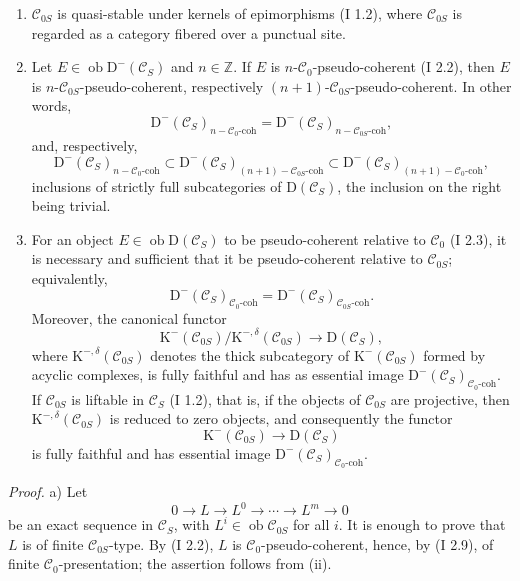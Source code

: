 \documentclass[11pt]{article}
\providecommand{\Ob}{\operatorname{ob}}
\begin{document}
\begin{enumerate}[label=\alph*)]
\item $\mathcal C_{0S}$ is quasi-stable under kernels of epimorphisms (I 1.2), where $\mathcal C_{0S}$ is regarded as a category fibered over a punctual site.
\item Let $E\in\Ob \mathrm D^{-}(\mathcal C_S)$ and $n\in\mathbb Z$. If $E$ is $n$-$\mathcal C_0$-pseudo-coherent (I 2.2), then $E$ is $n$-$\mathcal C_{0S}$-pseudo-coherent, respectively $(n+1)$-$\mathcal C_{0S}$-pseudo-coherent. In other words,
\[
\mathrm D^{-}(\mathcal C_S)_{n-\mathcal C_0\text{-coh}}
=
\mathrm D^{-}(\mathcal C_S)_{n-\mathcal C_{0S}\text{-coh}},
\]
and, respectively,
\[
\mathrm D^{-}(\mathcal C_S)_{n-\mathcal C_0\text{-coh}}
\subset
\mathrm D^{-}(\mathcal C_S)_{(n+1)-\mathcal C_{0S}\text{-coh}}
\subset
\mathrm D^{-}(\mathcal C_S)_{(n+1)-\mathcal C_0\text{-coh}},
\]
inclusions of strictly full subcategories of $\mathrm D(\mathcal C_S)$, the inclusion on the right being trivial.
\item For an object $E\in\Ob\mathrm D(\mathcal C_S)$ to be pseudo-coherent relative to $\mathcal C_0$ (I 2.3), it is necessary and sufficient that it be pseudo-coherent relative to $\mathcal C_{0S}$; equivalently,
\[
\mathrm D^{-}(\mathcal C_S)_{\mathcal C_0\text{-coh}}
=
\mathrm D^{-}(\mathcal C_S)_{\mathcal C_{0S}\text{-coh}}.
\]
Moreover, the canonical functor
\[
\mathrm K^{-}(\mathcal C_{0S})/\mathrm K^{-,\delta}(\mathcal C_{0S})
\longrightarrow \mathrm D(\mathcal C_S),
\]
where $\mathrm K^{-,\delta}(\mathcal C_{0S})$ denotes the thick subcategory of $\mathrm K^{-}(\mathcal C_{0S})$ formed by acyclic complexes, is fully faithful and has as essential image $\mathrm D^{-}(\mathcal C_S)_{\mathcal C_0\text{-coh}}$. If $\mathcal C_{0S}$ is liftable in $\mathcal C_S$ (I 1.2), that is, if the objects of $\mathcal C_{0S}$ are projective, then $\mathrm K^{-,\delta}(\mathcal C_{0S})$ is reduced to zero objects, and consequently the functor
\[
\mathrm K^{-}(\mathcal C_{0S})\longrightarrow \mathrm D(\mathcal C_S)
\]
is fully faithful and has essential image $\mathrm D^{-}(\mathcal C_S)_{\mathcal C_0\text{-coh}}$.
\end{enumerate}

\emph{Proof.} a) Let
\[
0\longrightarrow L\longrightarrow L^0\longrightarrow\cdots\longrightarrow L^m\longrightarrow0
\]
be an exact sequence in $\mathcal C_S$, with $L^i\in\Ob\mathcal C_{0S}$ for all $i$. It is enough to prove that $L$ is of finite $\mathcal C_{0S}$-type. By (I 2.2), $L$ is $\mathcal C_0$-pseudo-coherent, hence, by (I 2.9), of finite $\mathcal C_0$-presentation; the assertion follows from (ii).
\end{document}
